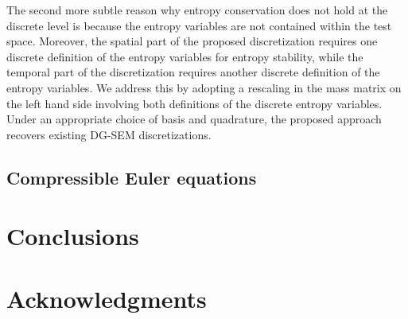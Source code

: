 \documentclass[preprint,10pt]{article}
\theoremstyle{definition}
\theoremstyle{lemma}
\theoremstyle{theorem}
\begin{document}
The second more subtle reason why entropy conservation does not hold at the discrete level is because the entropy variables are not contained within the test space.  Moreover, the spatial part of the proposed discretization requires one discrete definition of the entropy variables for entropy stability, while the temporal part of the discretization requires another discrete definition of the entropy variables.  We address this by adopting a rescaling in the mass matrix on the left hand side involving both definitions of the discrete entropy variables.  Under an appropriate choice of basis and quadrature, the proposed approach recovers existing DG-SEM discretizations. 


\subsection{Compressible Euler equations}

\section{Conclusions}

\section{Acknowledgments}





\end{document}
